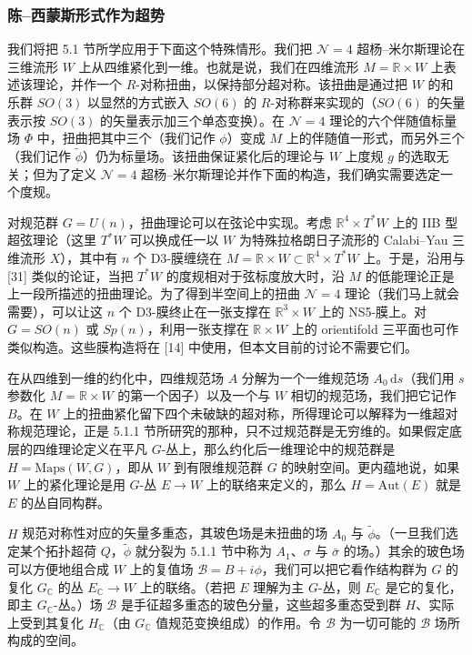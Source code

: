 \documentclass[11pt,a4paper,UTF8]{ctexart}
\theoremstyle{plain}
\theoremstyle{definition}
\begin{document}
\subsubsection{陈–西蒙斯形式作为超势}

我们将把 5.1 节所学应用于下面这个特殊情形。我们把 $\mathcal{N}=4$ 超杨–米尔斯理论在三维流形 $W$ 上从四维紧化到一维。也就是说，我们在四维流形 $M=\mathbb{R}\times W$ 上表述该理论，并作一个 $R$-对称扭曲，以保持部分超对称。该扭曲是通过把 $W$ 的和乐群 $SO(3)$ 以显然的方式嵌入 $SO(6)$ 的 $R$-对称群来实现的（$SO(6)$ 的矢量表示按 $SO(3)$ 的矢量表示加三个单态变换）。在 $\mathcal{N}=4$ 理论的六个伴随值标量场 $\Phi$ 中，扭曲把其中三个（我们记作 $\phi$）变成 $M$ 上的伴随值一形式，而另外三个（我们记作 $\tilde\phi$）仍为标量场。该扭曲保证紧化后的理论与 $W$ 上度规 $g$ 的选取无关；但为了定义 $\mathcal{N}=4$ 超杨–米尔斯理论并作下面的构造，我们确实需要选定一个度规。

对规范群 $G=U(n)$，扭曲理论可以在弦论中实现。考虑 $\mathbb{R}^4\times T^*W$ 上的 IIB 型超弦理论（这里 $T^*W$ 可以换成任一以 $W$ 为特殊拉格朗日子流形的 Calabi–Yau 三维流形 $X$），其中有 $n$ 个 D3-膜缠绕在 $M=\mathbb{R}\times W\subset\mathbb{R}^4\times T^*W$ 上。于是，沿用与 [31] 类似的论证，当把 $T^*W$ 的度规相对于弦标度放大时，沿 $M$ 的低能理论正是上一段所描述的扭曲理论。为了得到半空间上的扭曲 $\mathcal{N}=4$ 理论（我们马上就会需要），可以让这 $n$ 个 D3-膜终止在一张支撑在 $\mathbb{R}^3\times W$ 上的 NS5-膜上。对 $G=SO(n)$ 或 $Sp(n)$，利用一张支撑在 $\mathbb{R}\times W$ 上的 orientifold 三平面也可作类似构造。这些膜构造将在 [14] 中使用，但本文目前的讨论不需要它们。

在从四维到一维的约化中，四维规范场 $A$ 分解为一个一维规范场 $A_0\,\mathrm{d}s$（我们用 $s$ 参数化 $M=\mathbb{R}\times W$ 的第一个因子）以及一个与 $W$ 相切的规范场，我们把它记作 $B$。在 $W$ 上的扭曲紧化留下四个未破缺的超对称，所得理论可以解释为一维超对称规范理论，正是 5.1.1 节所研究的那种，只不过规范群是无穷维的。如果假定底层的四维理论定义在平凡 $G$-丛上，那么约化后一维理论中的规范群是 $H=\mathrm{Maps}(W,G)$，即从 $W$ 到有限维规范群 $G$ 的映射空间。更内蕴地说，如果 $W$ 上的紧化理论是用 $G$-丛 $E\to W$ 上的联络来定义的，那么 $H=\mathrm{Aut}(E)$ 就是 $E$ 的丛自同构群。

$H$ 规范对称性对应的矢量多重态，其玻色场是未扭曲的场 $A_0$ 与 $\tilde\phi$。（一旦我们选定某个拓扑超荷 $Q$，$\tilde\phi$ 就分裂为 5.1.1 节中称为 $A_1$、$\sigma$ 与 $\bar\sigma$ 的场。）其余的玻色场可以方便地组合成 $W$ 上的复值场 $\mathcal{B}=B+i\phi$，我们可以把它看作结构群为 $G$ 的复化 $G_{\mathbb{C}}$ 的丛 $E_{\mathbb{C}}\to W$ 上的联络。（若把 $E$ 理解为主 $G$-丛，则 $E_{\mathbb{C}}$ 是它的复化，即主 $G_{\mathbb{C}}$-丛。）场 $\mathcal{B}$ 是手征超多重态的玻色分量，这些超多重态受到群 $H$、实际上受到其复化 $H_{\mathbb{C}}$（由 $G_{\mathbb{C}}$ 值规范变换组成）的作用。令 $\mathcal{B}$ 为一切可能的 $\mathcal{B}$ 场所构成的空间。
\end{document}
